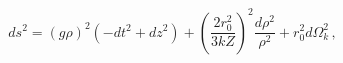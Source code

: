\begin{equation}
ds^2 = (g\rho)^2(-dt^2 + dz^2) + \left(\frac{2r_0^2}{3kZ}\right)^2
       \frac{d\rho^2}{\rho^2} + r_0^2 d\Omega_k^2\,,
\end{equation}

